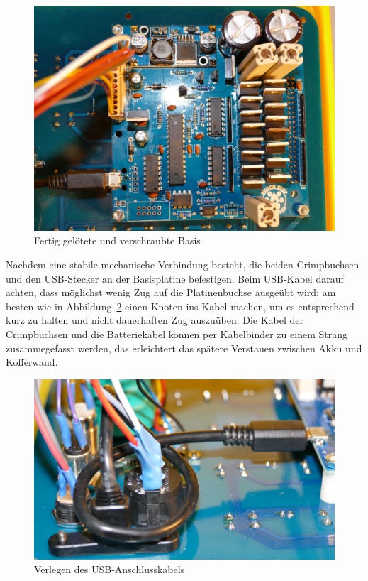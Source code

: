 \documentclass[paper=a4, open=any, numbers=noenddot]{scrbook}
\begin{document}
			\begin{figure}
				\begin{center}
					\includegraphics[width=\textwidth]{Bilder/base-eingebaut}
				\end{center}
				\caption{Fertig gelötete und verschraubte Basis}
				\label{fig:base-eingebaut}
			\end{figure}

			Nachdem eine stabile mechanische Verbindung besteht, die beiden Crimpbuchsen und den USB-Stecker an der Basisplatine befestigen. Beim USB-Kabel darauf achten, dass möglichst wenig Zug auf die Platinenbuchse ausgeübt wird; am besten wie in Abbildung~\ref{fig:usbknoten} einen Knoten ins Kabel machen, um es entsprechend kurz zu halten und nicht dauerhaften Zug auszuüben. Die Kabel der Crimpbuchsen und die Batteriekabel können per Kabelbinder zu einem Strang zusammegefasst werden, das erleichtert das spätere Verstauen zwischen Akku und Kofferwand.

			\begin{figure}
				\begin{center}
					\includegraphics[width=.8\textwidth]{Bilder/usb-knoten}
				\end{center}
				\caption{Verlegen des USB-Anschlusskabels}
				\label{fig:usbknoten}
			\end{figure}
\end{document}
